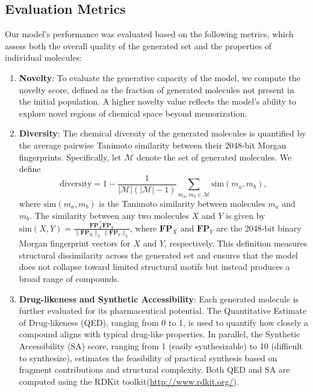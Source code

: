 \documentclass[lettersize,journal]{IEEEtran}
\begin{document}
\subsection{Evaluation Metrics}
Our model's performance was evaluated based on the following metrics, which assess both the overall quality of the generated set and the properties of individual molecules:
\begin{enumerate}
    \item \textbf{Novelty}: To evaluate the generative capacity of the model, we compute the novelty score, defined as the fraction of generated molecules not present in the initial population. A higher novelty value reflects the model’s ability to explore novel regions of chemical space beyond memorization.
    \item \textbf{Diversity}: The chemical diversity of the generated molecules is quantified by the average pairwise Tanimoto similarity between their 2048-bit Morgan fingerprints\cite{you2018graph}. Specifically, let $\mathcal{M}$ denote the set of generated molecules. We define
    \begin{equation}
        \mathrm{diversity} = 1 - \frac{1}{|\mathcal{M}|(|\mathcal{M}| - 1)} \sum_{m_a,m_b \in \mathcal{M}} \mathrm{sim}(m_a, m_b),
    \end{equation}    
    where $\mathrm{sim}(m_a,m_b)$ is the Tanimoto similarity between molecules $m_a$ and $m_b$. The similarity between any two molecules $X$ and $Y$ is given by $\mathrm{sim}(X,Y) = \frac{\mathbf{FP}_X^\top \mathbf{FP}_Y}{\|\mathbf{FP}_X\|_2\,\|\mathbf{FP}_Y\|_2}$, where $\mathbf{FP}_X$ and $\mathbf{FP}_Y$ are the 2048‑bit binary Morgan fingerprint vectors for $X$ and $Y$, respectively. This definition measures structural dissimilarity across the generated set and ensures that the model does not collapse toward limited structural motifs but instead produces a broad range of compounds.
    \item \textbf{Drug-likeness and Synthetic Accessibility}: Each generated molecule is further evaluated for its pharmaceutical potential. The Quantitative Estimate of Drug-likeness (QED), ranging from 0 to 1, is used to quantify how closely a compound aligns with typical drug-like properties. In parallel, the Synthetic Accessibility (SA) score, ranging from 1 (easily synthesizable) to 10 (difficult to synthesize), estimates the feasibility of practical synthesis based on fragment contributions\cite{ertl2009estimation} and structural complexity. Both QED and SA are computed using the RDKit\cite{landrum2006rdkit} toolkit(\url{http://www.rdkit.org/}).

\end{enumerate}
\end{document}

